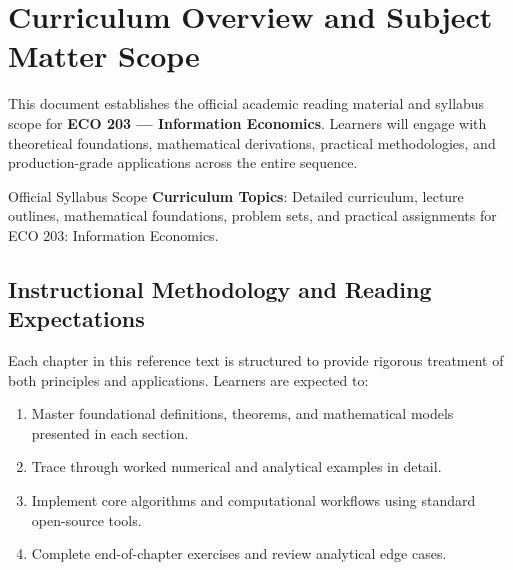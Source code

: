 \section{Curriculum Overview and Subject Matter Scope}

This document establishes the official academic reading material and syllabus scope for \textbf{ECO 203 --- Information Economics}. Learners will engage with theoretical foundations, mathematical derivations, practical methodologies, and production-grade applications across the entire sequence.

\begin{InsightBox}{Official Syllabus Scope}
  \textbf{Curriculum Topics}: Detailed curriculum, lecture outlines, mathematical foundations, problem sets, and practical assignments for ECO 203: Information Economics.
\end{InsightBox}

\subsection{Instructional Methodology and Reading Expectations}

Each chapter in this reference text is structured to provide rigorous treatment of both principles and applications. Learners are expected to:
\begin{enumerate}
  \item Master foundational definitions, theorems, and mathematical models presented in each section.
  \item Trace through worked numerical and analytical examples in detail.
  \item Implement core algorithms and computational workflows using standard open-source tools.
  \item Complete end-of-chapter exercises and review analytical edge cases.
\end{enumerate}

